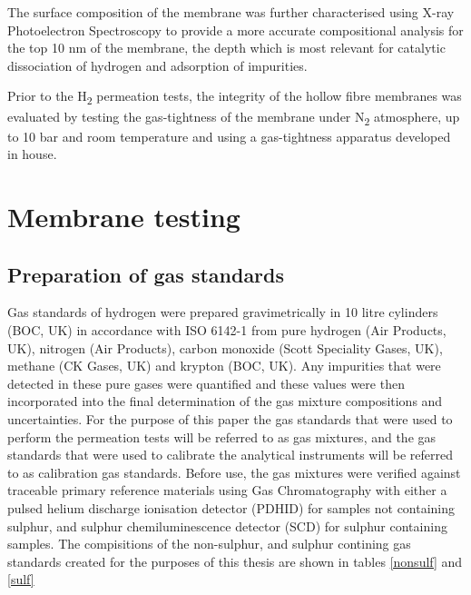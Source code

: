 The surface composition of the membrane was further characterised using X-ray Photoelectron Spectroscopy to provide a more accurate compositional analysis for the top 10 nm of the membrane, the depth which is most relevant for catalytic dissociation of hydrogen and adsorption of impurities.

Prior to the H\textsubscript{2} permeation tests, the integrity of the hollow fibre membranes was evaluated by testing the gas-tightness of the membrane under N\textsubscript{2} atmosphere, up to 10 bar and room temperature and using a gas-tightness apparatus developed in house. \cite{GouveiaGil2015}

\section{Membrane testing}
\subsection{Preparation of gas standards}
Gas standards of hydrogen were prepared gravimetrically in 10 litre cylinders (BOC, UK) in accordance with ISO 6142-1 from pure hydrogen (Air Products, UK), nitrogen (Air Products), carbon monoxide (Scott Speciality Gases, UK), methane (CK Gases, UK) and krypton (BOC, UK). Any impurities that were detected in these pure gases were quantified and these values were then incorporated into the final determination of the gas mixture compositions and uncertainties. For the purpose of this paper the gas standards that were used to perform the permeation tests will be referred to as gas mixtures, and the gas standards that were used to calibrate the analytical instruments will be referred to as calibration gas standards. Before use, the gas mixtures were verified against traceable primary reference materials using Gas Chromatography with either a pulsed helium discharge ionisation detector (PDHID) for samples not containing sulphur, and sulphur chemiluminescence detector (SCD) for sulphur containing samples. The compisitions of the non-sulphur, and sulphur contining gas standards created for the purposes of this thesis are shown in tables \ref{nonsulf} and \ref{sulf}

